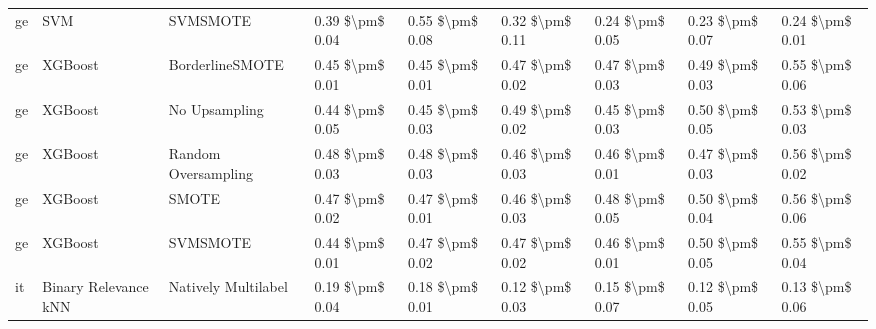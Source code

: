 \begin{tabular}{lllllllll}
      ge &                             SVM &                      SVMSMOTE & 0.39 \$\textbackslash pm\$ 0.04 &           0.55 \$\textbackslash pm\$ 0.08 &       0.32 \$\textbackslash pm\$ 0.11 &        0.24 \$\textbackslash pm\$ 0.05 &                         0.23 \$\textbackslash pm\$ 0.07 &     0.24 \$\textbackslash pm\$ 0.01 \\
      ge &                         XGBoost &               BorderlineSMOTE & 0.45 \$\textbackslash pm\$ 0.01 &           0.45 \$\textbackslash pm\$ 0.01 &       0.47 \$\textbackslash pm\$ 0.02 &        0.47 \$\textbackslash pm\$ 0.03 &                         0.49 \$\textbackslash pm\$ 0.03 &     0.55 \$\textbackslash pm\$ 0.06 \\
      ge &                         XGBoost &                 No Upsampling & 0.44 \$\textbackslash pm\$ 0.05 &           0.45 \$\textbackslash pm\$ 0.03 &       0.49 \$\textbackslash pm\$ 0.02 &        0.45 \$\textbackslash pm\$ 0.03 &                         0.50 \$\textbackslash pm\$ 0.05 &     0.53 \$\textbackslash pm\$ 0.03 \\
      ge &                         XGBoost &           Random Oversampling & 0.48 \$\textbackslash pm\$ 0.03 &           0.48 \$\textbackslash pm\$ 0.03 &       0.46 \$\textbackslash pm\$ 0.03 &        0.46 \$\textbackslash pm\$ 0.01 &                         0.47 \$\textbackslash pm\$ 0.03 &     0.56 \$\textbackslash pm\$ 0.02 \\
      ge &                         XGBoost &                         SMOTE & 0.47 \$\textbackslash pm\$ 0.02 &           0.47 \$\textbackslash pm\$ 0.01 &       0.46 \$\textbackslash pm\$ 0.03 &        0.48 \$\textbackslash pm\$ 0.05 &                         0.50 \$\textbackslash pm\$ 0.04 &     0.56 \$\textbackslash pm\$ 0.06 \\
      ge &                         XGBoost &                      SVMSMOTE & 0.44 \$\textbackslash pm\$ 0.01 &           0.47 \$\textbackslash pm\$ 0.02 &       0.47 \$\textbackslash pm\$ 0.02 &        0.46 \$\textbackslash pm\$ 0.01 &                         0.50 \$\textbackslash pm\$ 0.05 &     0.55 \$\textbackslash pm\$ 0.04 \\
      it &            Binary Relevance kNN &           Natively Multilabel & 0.19 \$\textbackslash pm\$ 0.04 &           0.18 \$\textbackslash pm\$ 0.01 &       0.12 \$\textbackslash pm\$ 0.03 &        0.15 \$\textbackslash pm\$ 0.07 &                         0.12 \$\textbackslash pm\$ 0.05 &     0.13 \$\textbackslash pm\$ 0.06 \\

\end{tabular}
